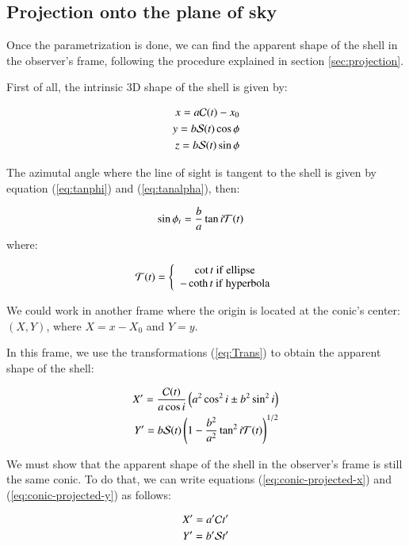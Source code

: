 \subsection{Projection onto the plane of sky} 

Once the parametrization is done, we can find the apparent shape of the shell in the observer's frame, following the procedure explained in section \ref{sec:projection}.

First of all, the intrinsic 3D shape of the shell is given by:

\begin{align}
x = a\mathcal{C}(t)-x_0 \\ 
y = b\mathcal{S}(t)\cos\phi \\
z =  b\mathcal{S}(t)\sin\phi
\end{align}

The azimutal angle where the line of sight is tangent to the shell is given by equation (\ref{eq:tanphi}) and (\ref{eq:tanalpha}), then:

\begin{align}
\sin\phi_t &= \frac{b}{a}\tan i\mathcal{T}(t) 
\end{align}
where:

\begin{align}
\mathcal{T}(t) = \left\lbrace \begin{array}{c}
\cot t ~\mathrm{if~ellipse} \\
-\coth t ~\mathrm{if~hyperbola}
\end{array}\right.
\end{align}

We could work in another frame where the origin is located at the conic's center: $(X,Y)$, where $X=x-X_0$ and $Y=y$.

In this frame,  we use the transformations (\ref{eq:Trans})  to obtain the apparent shape of the shell:

\begin{align}
X' = \frac{\mathcal{C}(t)}{a\cos i}\left(a^2\cos^2 i \pm b^2\sin^2 i\right)  \label{eq:conic-projected-x}\\
Y'= b\mathcal{S}(t)\left(1-\frac{b^2}{a^2}\tan^2 i\mathcal{T}(t)\right)^{1/2}
\label{eq:conic-projected-y}
\end{align}


We must show that the apparent shape of the shell in the observer's frame is still the same conic. To do that, we can write equations
(\ref{eq:conic-projected-x}) and (\ref{eq:conic-projected-y}) as follows:

\begin{align}
X' = a'\mathcal{C} t' \label{eq:conic-projected-x-2} \\
Y' = b'\mathcal{S} t' \label{eq:conic-projected-y-2}
\end{align}

